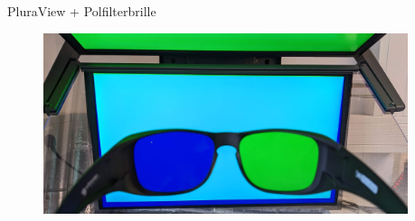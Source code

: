 \documentclass[final,hyperref={pdfpagelabels=false}]{beamer}
\begin{document}
\begin{frame}[t]
\begin{columns}[t]
\begin{column}{0.465\textwidth}
\begin{block}{PluraView + Polfilterbrille}
   \begin{figure}
       \includegraphics[width=.7\textwidth]{pluraviewBrille}
   \end{figure}
    



\end{block}



\end{column} %



\begin{column}{.025\textwidth}\end{column} %

\end{columns} %


\end{frame}
\end{document}
